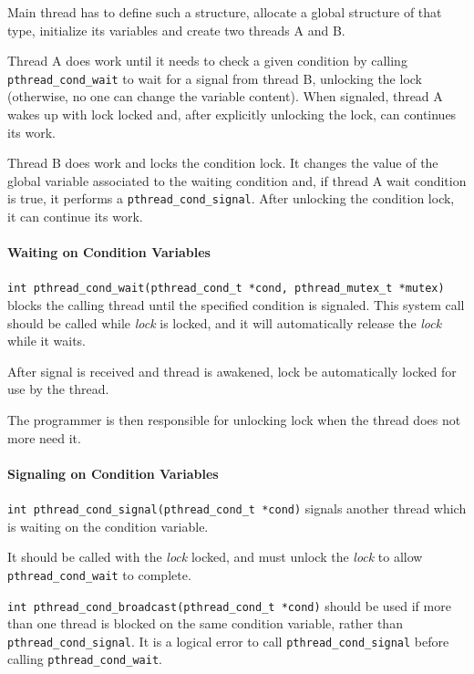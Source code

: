 Main thread has to define such a structure, allocate a global structure of that type, initialize its variables and create two threads A and B.

Thread A does work until it needs to check a given condition by calling \texttt{pthread\_cond\_wait} to wait for a signal from thread B, unlocking the lock (otherwise, no one can change the variable content). When signaled, thread A wakes up with lock locked and, after explicitly unlocking the lock, can continues its work.

Thread B does work and locks the condition lock. It changes the value of the global variable associated to the waiting condition and, if thread A wait condition is true, it performs a \texttt{pthread\_cond\_signal}. After unlocking the condition lock, it can continue its work.

\paragraph{Waiting on Condition Variables}
\begin{description}
\item \texttt{int pthread\_cond\_wait(pthread\_cond\_t *cond, \newline pthread\_mutex\_t *mutex)} blocks the calling thread until the specified condition is signaled. This system call should be called while \textit{lock} is locked, and it will automatically release the \textit{lock} while it waits.

After signal is received and thread is awakened, lock be automatically locked for use by the thread.

The programmer is then responsible for unlocking lock when the thread does not more need it.
\end{description}

\paragraph{Signaling on Condition Variables}
\begin{description}
\item \texttt{int pthread\_cond\_signal(pthread\_cond\_t *cond)} signals another thread which is waiting on the condition variable.

It should be called with the \textit{lock} locked, and must unlock the \textit{lock} to allow \texttt{pthread\_cond\_wait} to complete.

\item \texttt{int pthread\_cond\_broadcast(pthread\_cond\_t *cond)} \newline
should be used if more than one thread is blocked on the same condition variable, rather than \texttt{pthread\_cond\_signal}. It is a logical error to call \texttt{pthread\_cond\_signal} before calling \texttt{pthread\_cond\_wait}.
\end{description}


